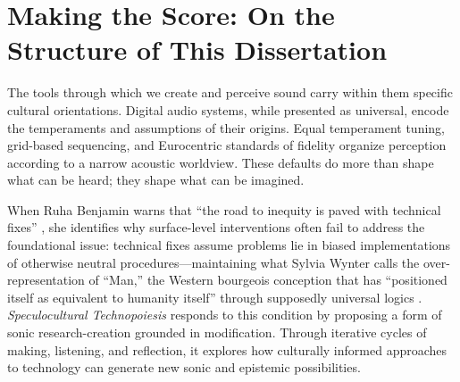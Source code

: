 %

\section*{Making the Score: On the Structure of This Dissertation}

The tools through which we create and perceive sound carry within them specific cultural orientations. Digital audio systems, while presented as universal, encode the temperaments and assumptions of their origins. Equal temperament tuning, grid-based sequencing, and Eurocentric standards of fidelity organize perception according to a narrow acoustic worldview. These defaults do more than shape what can be heard; they shape what can be imagined.

When Ruha Benjamin warns that ``the road to inequity is paved with technical fixes'' \parencite[p.~13]{Benjamin_2019a}, she identifies why surface-level interventions often fail to address the foundational issue: technical fixes assume problems lie in biased implementations of otherwise neutral procedures---maintaining what Sylvia Wynter calls the over-representation of ``Man,'' the Western bourgeois conception that has ``positioned itself as equivalent to humanity itself'' through supposedly universal logics \parencite{Wynter_2003}. \textit{Speculocultural Technopoiesis} responds to this condition by proposing a form of sonic research-creation grounded in modification. Through iterative cycles of making, listening, and reflection, it explores how culturally informed approaches to technology can generate new sonic and epistemic possibilities.

